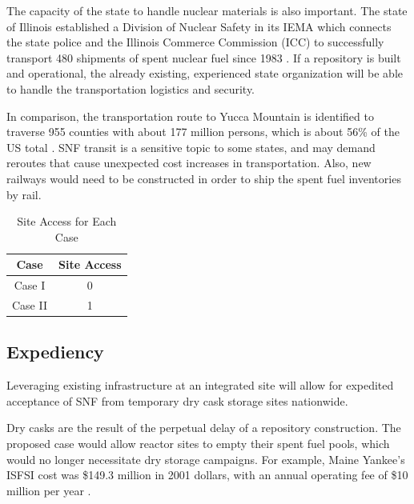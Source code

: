 The capacity of the state to handle nuclear materials is also important.
The state of Illinois established a Division of Nuclear Safety in its \gls{IEMA}
which connects the state police and the Illinois Commerce Commission (ICC) to
 successfully transport 480 shipments of spent nuclear fuel since 1983
 \cite{iema_illinois_2005}. If a repository is built and operational, the already existing,
 experienced state organization will be able to handle the transportation logistics
 and security.  

In comparison, the 
transportation route to Yucca Mountain is identified to traverse 955 counties
with about 177 million persons, which is about 56\% of the US total
 \cite{halstead_yucca_2011}. \gls{SNF} transit is a sensitive topic to some states, and may
 demand reroutes that cause unexpected cost increases in transportation. Also,
 new railways would need to be constructed in order to ship the spent fuel inventories
 by rail. 


\begin{table}[h]
	\centering
        \caption {Site Access for Each Case}
		\begin{tabular}{|c|c|}
			\hline
			Case & Site Access \\
			\hline
			Case I & 0 \\
			Case II & 1 \\
			\hline
                \end{tabular}
\end{table}



\subsection{Expediency}



Leveraging existing infrastructure at an integrated site will allow for 
expedited acceptance of \gls{SNF} from temporary dry cask storage sites 
nationwide.

Dry casks are the result of the perpetual delay of a repository construction.
The proposed case would allow reactor sites to empty their spent fuel pools, which
would no longer necessitate dry storage campaigns. For example, Maine Yankee's 
\gls{ISFSI} cost was \$149.3 million in 2001 dollars, with an annual operating fee
of \$10 million per year \cite{lee_costing_2009}. 

